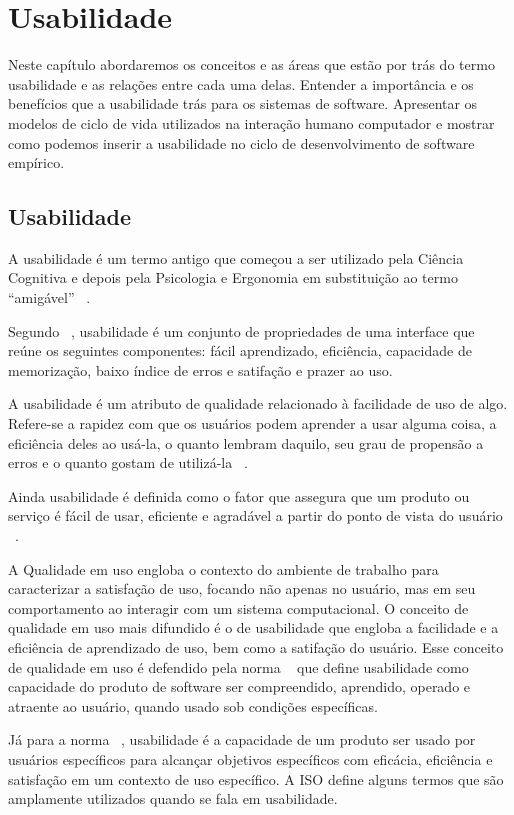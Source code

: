 \chapter{Usabilidade}

	Neste capítulo abordaremos os conceitos e as áreas que estão por trás do termo usabilidade e as relações entre cada uma delas. Entender a importância e os benefícios que a usabilidade trás para os sistemas de software. Apresentar os modelos de ciclo de vida utilizados na interação humano computador e mostrar como podemos inserir a usabilidade no ciclo de desenvolvimento de software empírico.

\section {Usabilidade}

	A usabilidade é um termo antigo que começou a ser utilizado pela Ciência Cognitiva e depois pela Psicologia e Ergonomia em substituição ao termo “amigável” ~\cite{dias2006}.
	
	Segundo ~, usabilidade é um conjunto de propriedades de uma interface que reúne os seguintes componentes: fácil aprendizado, eficiência, capacidade de memorização, baixo índice de erros e satifação e prazer ao uso.

	A usabilidade é um atributo de qualidade relacionado à facilidade de uso de algo. Refere-se a rapidez com que os usuários podem aprender a usar alguma coisa, a eficiência deles ao usá-la, o quanto lembram daquilo, seu grau de propensão a erros e o quanto gostam de utilizá-la ~\cite{nielsen2007}. 
	
	Ainda usabilidade é definida como o fator que assegura que um produto ou serviço é fácil de usar, eficiente e agradável a partir do ponto de vista do usuário ~\cite{preece2007}.
	
	A Qualidade em uso engloba o contexto do ambiente de trabalho para caracterizar a satisfação de uso, focando não apenas no usuário, mas em seu comportamento ao interagir com um sistema computacional. O conceito de qualidade em uso mais difundido é o de usabilidade que engloba a facilidade e a eficiência de aprendizado de uso, bem como a satifação do usuário. Esse conceito de qualidade em uso é defendido pela norma ~ que define usabilidade como  capacidade do produto de software ser compreendido, aprendido, operado e atraente ao usuário, quando usado sob condições específicas.
	
	Já para a norma ~, usabilidade é a capacidade de um produto ser usado por usuários específicos para alcançar objetivos específicos com eficácia, eficiência e satisfação em um contexto de uso específico. A ISO define alguns termos que são amplamente utilizados quando se fala em usabilidade.

